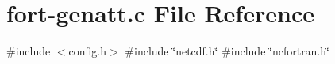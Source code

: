 \hypertarget{fort-genatt_8c}{}\section{fort-\/genatt.c File Reference}
\label{fort-genatt_8c}
{\ttfamily \#include $<$config.\+h$>$}\newline
{\ttfamily \#include \char`\"{}netcdf.\+h\char`\"{}}\newline
{\ttfamily \#include \char`\"{}ncfortran.\+h\char`\"{}}\newline
